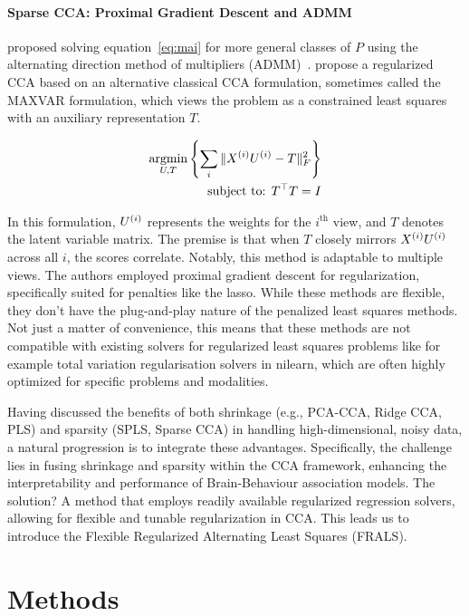 \paragraph{Sparse CCA: Proximal Gradient Descent and ADMM}
\citet{kanatsoulis2018structured} proposed solving equation~\ref{eq:mai} for more general classes of $P$ using the alternating direction method of multipliers (ADMM)~\citep{boyd2011distributed}.
\cite{fu2017scalable} propose a regularized CCA based on an alternative classical CCA formulation, sometimes called the MAXVAR formulation, which views the problem as a constrained least squares with an auxiliary representation $T$\citep{carroll1968generalization,kettenring1971canonical}.

\begin{align}\label{eq:fu}
    \underset{U, T}{\mathrm{argmin}}\left\{\sum_i \|X^{(i)} U^{(i)} - T\|_F^2\right\}\\
    \text{subject to: }T^\top T = I\\
\end{align}

In this formulation, \(U^{(i)}\) represents the \gls{weights} for the $i^{\text{th}}$ view, and \(T\) denotes the latent variable matrix.
The premise is that when \(T\) closely mirrors \(X^{(i)} U^{(i)}\) across all \(i\), the scores correlate.
Notably, this method is adaptable to multiple views.
The authors employed proximal gradient descent for regularization, specifically suited for penalties like the lasso.
While these methods are flexible, they don't have the plug-and-play nature of the penalized least squares methods.
Not just a matter of convenience, this means that these methods are not compatible with existing solvers for regularized least squares problems like for example total variation regularisation solvers in nilearn, which are often highly optimized for specific problems and modalities.

Having discussed the benefits of both shrinkage (e.g., PCA-CCA, Ridge CCA, PLS) and sparsity (SPLS, Sparse CCA) in handling high-dimensional, noisy data, a natural progression is to integrate these advantages.
Specifically, the challenge lies in fusing shrinkage and sparsity within the CCA framework, enhancing the interpretability and performance of Brain-Behaviour association models.
The solution?
A method that employs readily available regularized regression solvers, allowing for flexible and tunable regularization in CCA.
This leads us to introduce the Flexible Regularized Alternating Least Squares (FRALS).
\newpage
\section{Methods}

